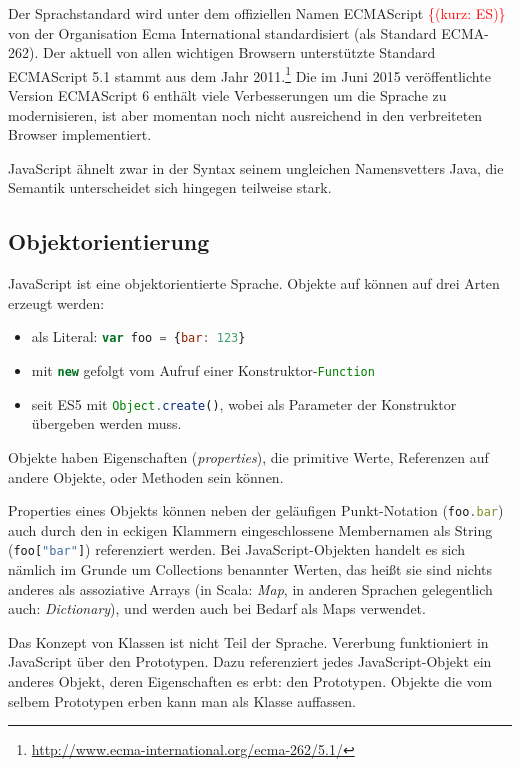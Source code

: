 \documentclass[a4paper, 12pt, hidelinks, listof=totoc, listoftables=totoc, bibliography=totoc]{scrreprt}
\newcommand{\code}[1]{\lstinline[language=Scala, style=inline]|#1|}
\newcommand{\js}[1]{\lstinline[language=JavaScript, style=inline]|#1|}
\newcommand{\TODOi}[1]{\textcolor{red}{\{#1\}}}
\begin{document}
Der Sprachstandard wird unter dem offiziellen Namen ECMAScript \TODOi{(kurz: ES)} von der Organisation Ecma International standardisiert (als Standard ECMA-262). Der aktuell von allen wichtigen Browsern unterstützte Standard ECMAScript 5.1 stammt aus dem Jahr 2011.\footnote{\url{http://www.ecma-international.org/ecma-262/5.1/}} Die im Juni 2015 veröffentlichte Version ECMAScript 6 enthält viele Verbesserungen um die Sprache zu modernisieren, ist aber momentan noch nicht ausreichend in den verbreiteten Browser implementiert.

JavaScript ähnelt zwar in der Syntax seinem ungleichen Namensvetters Java, die Semantik unterscheidet sich hingegen teilweise stark\cite{eich1996.JSL}.


\subsection{Objektorientierung}

JavaScript ist eine objektorientierte Sprache. Objekte auf können auf drei Arten erzeugt werden:

\begin{itemize}
  \item als Literal: \js{var foo = {bar: 123}}
  \item mit \js{new} gefolgt vom Aufruf einer Konstruktor-\code{Function}
  \item seit ES5 mit \js{Object.create()}, wobei als Parameter der Konstruktor übergeben werden muss.
\end{itemize}

Objekte haben Eigenschaften (\textit{properties}), die primitive Werte, Referenzen auf andere Objekte, oder Methoden sein können.

Properties eines Objekts können neben der geläufigen Punkt-Notation (\js{foo.bar}) auch durch den in eckigen Klammern eingeschlossene Membernamen als String \mbox{(\js{foo["bar"]})} referenziert werden. Bei JavaScript-Objekten handelt es sich nämlich im Grunde um Collections benannter Werten, das heißt sie sind nichts anderes als assoziative Arrays (in Scala: \textit{Map}, in anderen Sprachen gelegentlich auch: \textit{Dictionary}), und werden auch bei Bedarf als Maps verwendet.

Das Konzept von Klassen ist nicht Teil der Sprache. Vererbung funktioniert in JavaScript über den Prototypen. Dazu referenziert jedes JavaScript-Objekt ein anderes Objekt, deren Eigenschaften es erbt: den Prototypen. Objekte die vom selbem Prototypen erben kann man als Klasse auffassen.\cite{mdn.WWO}\cite[S. 115 ff., S. 199 ff.]{flanagan2011.JDG}
\end{document}
